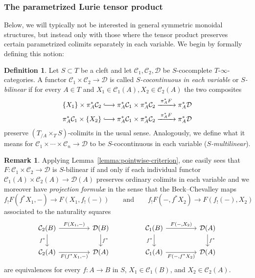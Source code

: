 \documentclass[reqno]{memo-l}
\theoremstyle{mythm}
\theoremstyle{definition}
\newtheorem{rk}[thm]{Remark}
\newtheorem{definition}[thm]{Definition}
\numberwithin{equation}{section}
\newcommand{\Cc}{{\mathcal{C}}}
\newcommand{\Dd}{{\mathcal{D}}}
\begin{document}
\subsubsection{The parametrized Lurie tensor product}\label{subsubsec:param-Lurie} Below, we will typically not be interested in general symmetric monoidal structures, but instead only with those where the tensor product preserves certain parametrized colimits separately in each variable. We begin by formally defining this notion:

\begin{definition}
    Let $S\subset T$ be a cleft and let $\Cc_1,\Cc_2,\Dd$ be $S$-cocomplete $T$-$\infty$-categories. A functor $\Cc_1\times\Cc_2\to\Dd$ is called \emph{$S$-cocontinuous in each variable} or \emph{$S$-bilinear} if for every $A\in T$ and $X_1\in\Cc_1(A), X_2\in\Cc_2(A)$ the two composites
    \begin{align*}
        \{X_1\}\times\pi_A^*\Cc_2&\lhook\joinrel\longrightarrow \pi_A^*\Cc_1\times\pi_A^*\Cc_2\xrightarrow{\;\pi_A^*F\;}\pi_A^*\Dd\\
        \pi_A^*\Cc_1\times\{X_2\}&\lhook\joinrel\longrightarrow\pi_A^*\Cc_1\times\pi_A^*\Cc_2\xrightarrow{\;\pi_A^*F\;}\pi_A^*\Dd
    \end{align*}
    preserve $(T_{/A}\times_TS)$-colimits in the usual sense. Analogously, we define what it means for $\Cc_1\times\cdots\times\Cc_n\to\Dd$ to be $S$-cocontinuous in each variable (\emph{$S$-multilinear}).
\end{definition}

\begin{rk}
    Applying Lemma~\ref{lemma:pointwise-criterion}, one easily sees that $F\colon\Cc_1\times\Cc_2\to\Dd$ is $S$-bilinear if and only if each individual functor $\Cc_1(A)\times\Cc_2(A)\to\Dd(A)$ preserves ordinary colimits in each variable and we moreover have \emph{projection formul\ae} in the sense that the Beck--Chevalley maps
    \[
        f_!F(f^*X_1,-)\to F(X_1,f_!(-))\qquad\text{and}\qquad
        f_!F(-,f^*X_2)\to F(f_!(-),X_2)
    \]
    associated to the naturality squares
    \[
        \begin{tikzcd}[column sep=4.5em]
            \Cc_2(B)\arrow[r, "{F(X_1,-)}"]\arrow[d,"f^*"'] & \Dd(B)\arrow[d,"f^*"] & \Cc_1(B)\arrow[r,"{F(-,X_2)}"]\arrow[d,"f^*"'] & \Dd(A)\arrow[d,"f^*"]\\
            \Cc_2(A)\arrow[r,"{F(f^*X_1,-)}"'] & \Dd(A) & \Cc_1(A)\arrow[r,"{F(-,f^*X_2)}"'] & \Dd(A)
        \end{tikzcd}
    \]
    are equivalences for every $f\colon A\to B$ in $S$, $X_1\in\Cc_1(B)$, and $X_2\in\Cc_2(A)$. 
\end{rk}
\end{document}
